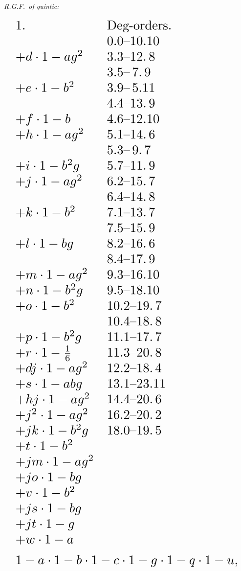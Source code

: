 \documentclass[11pt]{article}
\begin{document}


\begin{center}
\textit{R.G.F.\ of quintic:}
\end{center}
\[
\resizebox{\textwidth}{!}{$\displaystyle
\begin{array}{ll}
1. & \text{Deg-orders.}\\
& 0.0\text{--}10.10\\
+d \cdot 1 - ag^{2} & 3.3\text{--}12.\,8\\
& 3.5\text{--}\,7.\,9\\
+e \cdot 1 - b^{2} & 3.9\text{--}\,5.11\\
& 4.4\text{--}13.\,9\\
+f \cdot 1 - b & 4.6\text{--}12.10\\
+h \cdot 1 - ag^{2} & 5.1\text{--}14.\,6\\
& 5.3\text{--}\,9.\,7\\
+i \cdot 1 - b^{2}g & 5.7\text{--}11.\,9\\
+j \cdot 1 - ag^{2} & 6.2\text{--}15.\,7\\
& 6.4\text{--}14.\,8\\
+k \cdot 1 - b^{2} & 7.1\text{--}13.\,7\\
& 7.5\text{--}15.\,9\\
+l \cdot 1 - bg & 8.2\text{--}16.\,6\\
& 8.4\text{--}17.\,9\\
+m \cdot 1 - ag^{2} & 9.3\text{--}16.10\\
+n \cdot 1 - b^{2}g & 9.5\text{--}18.10\\
+o \cdot 1 - b^{2} & 10.2\text{--}19.\,7\\
& 10.4\text{--}18.\,8\\
+p \cdot 1 - b^{2}g & 11.1\text{--}17.\,7\\
+r \cdot 1 - \tfrac{1}{6} & 11.3\text{--}20.\,8\\
+dj \cdot 1 - ag^{2} & 12.2\text{--}18.\,4\\
+s \cdot 1 - abg & 13.1\text{--}23.11\\
+hj \cdot 1 - ag^{2} & 14.4\text{--}20.\,6\\
+j^{2} \cdot 1 - ag^{2} & 16.2\text{--}20.\,2\\
+jk \cdot 1 - b^{2}g & 18.0\text{--}19.\,5\\
+t \cdot 1 - b^{2} & \\
+jm \cdot 1 - ag^{2} & \\
+jo \cdot 1 - bg & \\
+v \cdot 1 - b^{2} & \\
+js \cdot 1 - bg & \\
+jt \cdot 1 - g & \\
+w \cdot 1 - a & \\[4pt]
\multicolumn{2}{l}{1 - a\cdot 1 - b\cdot 1 - c\cdot 1 - g\cdot 1 - q\cdot 1 - u,}
\end{array}$}
\]
\end{document}
